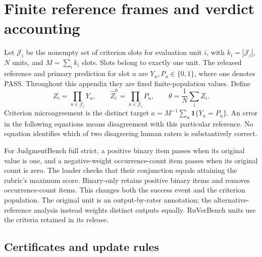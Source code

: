\section{Finite reference frames and verdict accounting}
\label{app:accounting}

Let $\mathcal J_i$ be the nonempty set of criterion slots for evaluation unit
$i$, with $k_i=|\mathcal J_i|$, $N$ units, and
$M=\sum_i k_i$ slots. Slots belong to exactly one unit. The released reference
and primary prediction for slot $u$ are $Y_u,P_u\in\{0,1\}$, where one denotes
PASS. Throughout this appendix they are fixed finite-population values. Define
\begin{equation}
 Z_i=\prod_{u\in\mathcal J_i}Y_u,
 \qquad \widehat Z_i^0=\prod_{u\in\mathcal J_i}P_u,
 \qquad \theta=\frac{1}{N}\sum_i Z_i.
 \label{app:eq:targets}
\end{equation}
Criterion microagreement is the distinct target
$a=M^{-1}\sum_u\mathbf 1\{Y_u=P_u\}$.
An error in the following equations means disagreement with this particular
reference. No equation identifies which of two disagreeing human raters is
substantively correct.

For JudgmentBench full strict, a positive binary item passes when its original
value is one, and a negative-weight occurrence-count item passes when its
original count is zero. The loader checks that their conjunction equals
attaining the rubric's maximum score. Binary-only retains positive binary
items and removes occurrence-count items. This changes both the success event
and the criterion population. The original unit is an output-by-rater
annotation; the alternative-reference analysis instead weights distinct
outputs equally. RuVerBench units use the criteria retained in its release.

\subsection{Certificates and update rules}
\label{app:certificates}

